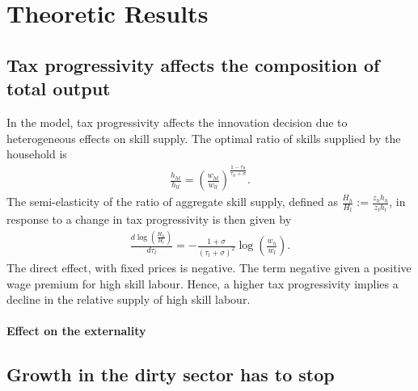 \section{Theoretic Results}

\subsection{Tax progressivity affects the composition of total output}
In the model, tax progressivity affects the innovation decision due to heterogeneous effects on skill supply. 
The optimal ratio of skills supplied by the household is
\begin{align}
\frac{h_{ht}}{h_{lt}}=\left(\frac{w_{ht}}{w_{lt}}\right)^\frac{1-\tau_{lt}}{\tau_{lt}+\sigma}.
\end{align}
The semi-elasticity of the ratio of aggregate skill supply, defined as $\frac{H_h}{H_l}:=\frac{z_hh_h}{z_lh_l}$, in response to a change in tax progressivity is then given by
\begin{align}
\frac{d\log\left(\frac{H_h}{H_l}\right)}{d\tau_l}=-\frac{1+\sigma}{(\tau_l+\sigma)^2}\log\left(\frac{w_{h}}{w_l}\right). \end{align}
The direct effect, with fixed prices is negative. 
The term negative given a positive wage premium for high skill labour. Hence, a higher tax progressivity implies a decline in the relative supply of high skill labour. 

\paragraph{Effect on the externality }

\subsection{Growth in the dirty sector has to stop}